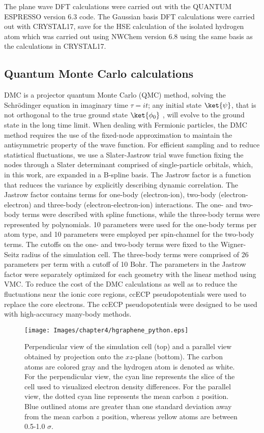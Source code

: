 The plane wave DFT calculations were carried out with the QUANTUM ESPRESSO version 6.3 code.\cite{10.1063/5.0005082,QE-2009,QE-2017}
The Gaussian basis DFT calculations were carried out with CRYSTAL17,\cite{10.1002/wcms.1360,10.1063/5.0004892} save for the HSE calculation of the isolated hydrogen atom which was carried out using NWChem version 6.8\cite{NWCHEM} using the same basis as the calculations in CRYSTAL17.

\subsection{Quantum Monte Carlo calculations}
DMC is a projector quantum Monte Carlo (QMC) method, solving the Schr\"{o}dinger equation in imaginary time $\tau=it$; any initial state $\ket{\psi}$, that is not orthogonal to the true ground state $\ket{\phi_0}$ , will evolve to the ground state in the long time limit.
When dealing with Fermionic particles, the DMC method requires the use of the fixed-node approximation\cite{Anderson1980} to maintain the antisymmetric property of the wave function. 
For efficient sampling and to reduce statistical fluctuations, we use a Slater-Jastrow trial wave function fixing the nodes through a Slater determinant comprised of single-particle orbitals, which, in this work, are expanded in a B-spline basis.
The Jastrow factor is a function that reduces the variance by explicitly describing dynamic correlation.
The Jastrow factor contains terms for one-body (electron-ion), two-body (electron-electron) and three-body  (electron-electron-ion) interactions.
The one- and two-body terms were described with spline functions\cite{10.1109/MCSE.2010.122}, while the three-body terms were represented by polynomials.\cite{10.1103/PhysRevB.70.235119}
10 parameters were used for the one-body terms per atom type, and 10 parameters were employed per spin-channel for the two-body terms. The cutoffs on the one- and two-body terms were fixed to the Wigner-Seitz radius of the simulation cell.
The three-body terms were comprised of 26 parameters per term with a cutoff of 10 Bohr.
The parameters in the Jastrow factor were separately optimized for each geometry with the linear method\cite{10.1103/PhysRevLett.98.110201} using VMC.
To reduce the cost of the DMC calculations as well as to reduce the fluctuations near the ionic core regions, ccECP pseudopotentials were used to replace the core electrons.\cite{ccecp_1,ccecp_2}
The ccECP pseudopotentials were designed to be used with high-accuracy many-body methods.
\begin{figure}
    \centering
    \texttt{[image: Images/chapter4/hgraphene\_python.eps]}
    \caption{ Perpendicular view of the simulation cell (top) and a parallel view obtained by projection onto the $xz$-plane (bottom). The carbon atoms are colored gray and the hydrogen atom is denoted as white. For the perpendicular view, the cyan line represents the slice of the cell used to visualized electron density differences. For the parallel view, the dotted cyan line represents the mean carbon $z$ position. Blue outlined atoms are greater than one standard deviation away from the mean carbon $z$ position, whereas yellow atoms are between 0.5-1.0 $\sigma$.}
    \label{fig:cell}
\end{figure}
